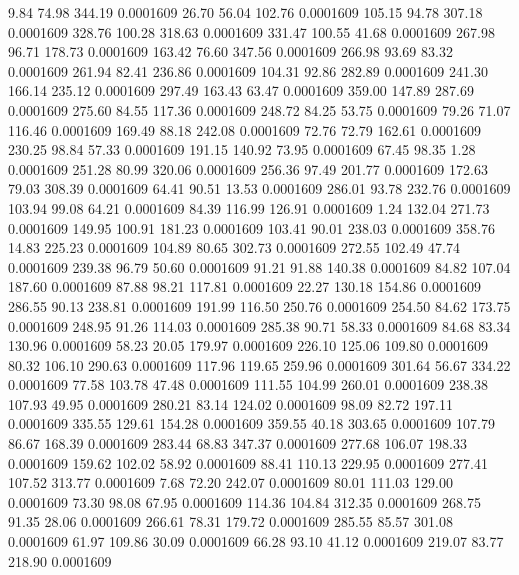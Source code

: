    9.84   74.98  344.19   0.0001609
  26.70   56.04  102.76   0.0001609
 105.15   94.78  307.18   0.0001609
 328.76  100.28  318.63   0.0001609
 331.47  100.55   41.68   0.0001609
 267.98   96.71  178.73   0.0001609
 163.42   76.60  347.56   0.0001609
 266.98   93.69   83.32   0.0001609
 261.94   82.41  236.86   0.0001609
 104.31   92.86  282.89   0.0001609
 241.30  166.14  235.12   0.0001609
 297.49  163.43   63.47   0.0001609
 359.00  147.89  287.69   0.0001609
 275.60   84.55  117.36   0.0001609
 248.72   84.25   53.75   0.0001609
  79.26   71.07  116.46   0.0001609
 169.49   88.18  242.08   0.0001609
  72.76   72.79  162.61   0.0001609
 230.25   98.84   57.33   0.0001609
 191.15  140.92   73.95   0.0001609
  67.45   98.35    1.28   0.0001609
 251.28   80.99  320.06   0.0001609
 256.36   97.49  201.77   0.0001609
 172.63   79.03  308.39   0.0001609
  64.41   90.51   13.53   0.0001609
 286.01   93.78  232.76   0.0001609
 103.94   99.08   64.21   0.0001609
  84.39  116.99  126.91   0.0001609
   1.24  132.04  271.73   0.0001609
 149.95  100.91  181.23   0.0001609
 103.41   90.01  238.03   0.0001609
 358.76   14.83  225.23   0.0001609
 104.89   80.65  302.73   0.0001609
 272.55  102.49   47.74   0.0001609
 239.38   96.79   50.60   0.0001609
  91.21   91.88  140.38   0.0001609
  84.82  107.04  187.60   0.0001609
  87.88   98.21  117.81   0.0001609
  22.27  130.18  154.86   0.0001609
 286.55   90.13  238.81   0.0001609
 191.99  116.50  250.76   0.0001609
 254.50   84.62  173.75   0.0001609
 248.95   91.26  114.03   0.0001609
 285.38   90.71   58.33   0.0001609
  84.68   83.34  130.96   0.0001609
  58.23   20.05  179.97   0.0001609
 226.10  125.06  109.80   0.0001609
  80.32  106.10  290.63   0.0001609
 117.96  119.65  259.96   0.0001609
 301.64   56.67  334.22   0.0001609
  77.58  103.78   47.48   0.0001609
 111.55  104.99  260.01   0.0001609
 238.38  107.93   49.95   0.0001609
 280.21   83.14  124.02   0.0001609
  98.09   82.72  197.11   0.0001609
 335.55  129.61  154.28   0.0001609
 359.55   40.18  303.65   0.0001609
 107.79   86.67  168.39   0.0001609
 283.44   68.83  347.37   0.0001609
 277.68  106.07  198.33   0.0001609
 159.62  102.02   58.92   0.0001609
  88.41  110.13  229.95   0.0001609
 277.41  107.52  313.77   0.0001609
   7.68   72.20  242.07   0.0001609
  80.01  111.03  129.00   0.0001609
  73.30   98.08   67.95   0.0001609
 114.36  104.84  312.35   0.0001609
 268.75   91.35   28.06   0.0001609
 266.61   78.31  179.72   0.0001609
 285.55   85.57  301.08   0.0001609
  61.97  109.86   30.09   0.0001609
  66.28   93.10   41.12   0.0001609
 219.07   83.77  218.90   0.0001609

